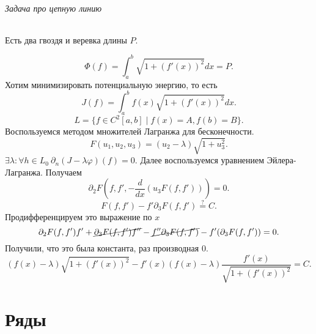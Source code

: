 \paragraph{Задача про цепную линию}
Есть два гвоздя и веревка длины $ P$.

\[
    \Phi(f) =   \int_{a}^{b} \sqrt{ 1+ (f'(x))^2}  dx = P
.\] 
Хотим минимизировать потенциальную энергию, то есть
\[
    J(f) = \int_{a}^{b} f(x) \sqrt{1 + (f'(x))^2 } dx 
.\] 
\[
    L = \{f \in C^2[a, b] \mid f(x) = A, f(b) = B\}
.\] 
Воспользуемся методом множителей Лагранжа для бесконечности.
\[
    F(u_1, u_2, u_3) = (u_2-\lambda)\sqrt{ 1+ u_3^2 } 
.\] 
$ \exists \lambda\colon \forall h \in L_0 ~ \partial _n (J - \lambda \varphi )(f) = 0$.
Далее воспользуемся уравнением Эйлера-Лагранжа.
Получаем
\[
    \partial _2 F(f, f', -\frac{d}{dx}(u_3 F(f, f'))) = 0
.\] 
\[
    F(f, f') - f' \partial _3F(f, f') \stackrel{?}{=} C
.\] 
Продифференцируем это выражение по $ x$
\[
    \partial _2 F(f, f')f' + \cancel{ \partial _3 F(f, f') f''} - \cancel{ f'' \partial _3 F(f, f')} - f'(\partial _3 F(f, f')) = 0
.\] 
Получили, что это была константа, раз производная 0.
\[
    (f(x) - \lambda) \sqrt{ 1 + (f'(x))^2}  - f'(x) (f(x) - \lambda) \frac{f'(x)}{\sqrt{1+(f'(x))^2 } } = C
.\] 



\part{Ряды}
